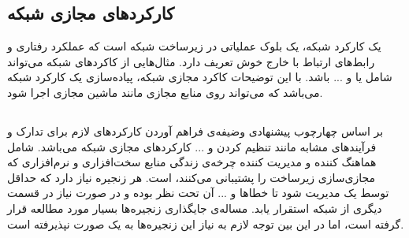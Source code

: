 \subsection{کارکردهای مجازی شبکه}
یک کارکرد شبکه، یک بلوک عملیاتی در زیرساخت شبکه است که عملکرد رفتاری و رابط‌های ارتباط با خارج خوش تعریف دارد.
مثال‌هایی از کاکردهای شبکه می‌تواند شامل
یا
و ... باشد.
با این توضیحات کاکرد مجازی شبکه، پیاده‌سازی یک کارکرد شبکه می‌باشد
که می‌تواند روی منابع مجازی مانند ماشین مجازی اجرا شود.

\subsection{}
بر اساس چهارچوب پیشنهادی 
وضیفه‌ی  فراهم آوردن کارکردهای لازم
برای تدارک و فرآیند‌های مشابه مانند تنظیم کردن و ... کارکردهای مجازی شبکه می‌باشد.
 شامل هماهنگ کننده و مدیریت کننده چرخه‌ی زندگی
منابع سخت‌افزاری و نرم‌افزاری که مجازی‌سازی زیرساخت را پشتیبانی می‌کنند، است.
هر زنجیره نیاز دارد که حداقل توسط یک  مدیریت شود
تا خطاها و ... آن تحت نظر بوده و در صورت نیاز در قسمت دیگری از شبکه استقرار یابد.
مساله‌ی جایگذاری زنجیره‌ها بسیار مورد مطالعه قرار گرفته است، اما در این بین توجه لازم به نیاز این زنجیره‌ها به یک
صورت نپذیرفته است.